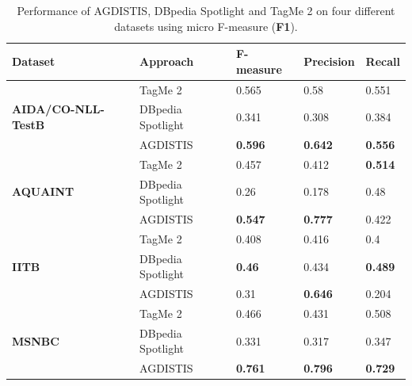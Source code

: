 \begin{table}[htb!]
    \centering

\begin{tabular}[tb]{@{}lllll@{}}
\toprule
Dataset                            & Approach          & \textbf{F-measure}             & \textbf{Precision} & \textbf{Recall} \\ \midrule
\multirow{3}{*}{\begin{minipage}{0.8in}\textbf{AIDA/CO-NLL-TestB}\end{minipage}} & TagMe 2           & 0.565          & 0.58      & 0.551  \\
                                   & DBpedia Spotlight & 0.341          & 0.308     & 0.384  \\
                                   & AGDISTIS          & \textbf{0.596} & \textbf{0.642}     & \textbf{0.556}  \\ \midrule
\multirow{3}{*}{\textbf{AQUAINT}}  & TagMe 2           & 0.457          & 0.412     & \textbf{0.514}  \\
                                   & DBpedia Spotlight & 0.26           & 0.178     & 0.48   \\
                                   & AGDISTIS          & \textbf{0.547} & \textbf{0.777}     & 0.422  \\\midrule
\multirow{3}{*}{\textbf{IITB}}     & TagMe 2           & 0.408          & 0.416     & 0.4    \\
                                   & DBpedia Spotlight & \textbf{0.46}  & 0.434     & \textbf{0.489}  \\
                                   & AGDISTIS          & 0.31           & \textbf{0.646}     & 0.204  \\\midrule
\multirow{3}{*}{\textbf{MSNBC}}    & TagMe 2           & 0.466          & 0.431     & 0.508  \\
                                   & DBpedia Spotlight & 0.331          & 0.317     & 0.347  \\
                                   & AGDISTIS          & \textbf{0.761} & \textbf{0.796}     & \textbf{0.729}  \\ \bottomrule
\end{tabular}
\caption{Performance of AGDISTIS, DBpedia Spotlight and TagMe 2 on four different datasets using micro F-measure (\textbf{F1}).}
\label{tab:evalnew}
\end{table}



